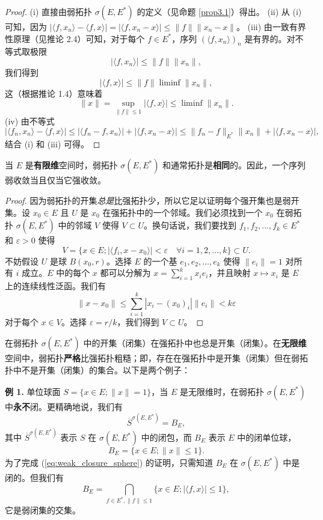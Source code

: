 \begin{proof}
(i) 直接由弱拓扑 $\sigma(E, E^*)$ 的定义（见命题 \ref{prop3.1}）得出。
(ii) 从 (i) 可知，因为 $|\langle f, x_n \rangle - \langle f, x \rangle| = |\langle f, x_n - x \rangle| \le \|f\| \|x_n - x\|$。
(iii) 由一致有界性原理（见推论 2.4）可知，对于每个 $f \in E^*$，序列 $(\langle f, x_n \rangle)_n$ 是有界的。对不等式取极限
\[ |\langle f, x_n \rangle| \le \|f\| \|x_n\|, \]
我们得到
\[ |\langle f, x \rangle| \le \|f\| \liminf \|x_n\|, \]
这（根据推论 1.4）意味着
\[ \|x\| = \sup_{\|f\| \le 1} |\langle f, x \rangle| \le \liminf \|x_n\|. \]
(iv) 由不等式
\[ |\langle f_n, x_n \rangle - \langle f, x \rangle| \le |\langle f_n - f, x_n \rangle| + |\langle f, x_n - x \rangle| \le \|f_n - f\|_{E^*} \|x_n\| + |\langle f, x_n - x \rangle|, \]
结合 (i) 和 (iii) 可得。
\end{proof}

\begin{proposition}\label{prop3.6}
当 $E$ 是\textbf{有限维}空间时，弱拓扑 $\sigma(E, E^*)$ 和通常拓扑是\textbf{相同}的。因此，一个序列弱收敛当且仅当它强收敛。
\end{proposition}

\begin{proof}
因为弱拓扑的开集\textit{总是}比强拓扑少，所以它足以证明每个强开集也是弱开集。设 $x_0 \in E$ 且 $U$ 是 $x_0$ 在强拓扑中的一个邻域。我们必须找到一个 $x_0$ 在弱拓扑 $\sigma(E, E^*)$ 中的邻域 $V$ 使得 $V \subset U$。换句话说，我们要找到 $f_1, f_2, \dots, f_k \in E^*$ 和 $\varepsilon > 0$ 使得
\[ V = \{x \in E; |\langle f_i, x - x_0 \rangle| < \varepsilon \quad \forall i = 1, 2, \dots, k\} \subset U. \]
不妨假设 $U$ 是球 $B(x_0, r)$。选择 $E$ 的一个基 $e_1, e_2, \dots, e_k$ 使得 $\|e_i\|=1$ 对所有 $i$ 成立。$E$ 中的每个 $x$ 都可以分解为 $x = \sum_{i=1}^k x_i e_i$，并且映射 $x \mapsto x_i$ 是 $E$ 上的连续线性泛函。我们有
\[ \|x - x_0\| \le \sum_{i=1}^k |x_i - (x_0)_i| \|e_i\| < k\varepsilon \]
对于每个 $x \in V$。选择 $\varepsilon = r/k$，我们得到 $V \subset U$。
\end{proof}

\begin{remark}\label{remark3.2}
在弱拓扑 $\sigma(E, E^*)$ 中的开集（闭集）在强拓扑中也总是开集（闭集）。在\textbf{无限维}空间中，弱拓扑\textbf{严格}比强拓扑粗糙；即，存在在强拓扑中是开集（闭集）但在弱拓扑中不是开集（闭集）的集合。以下是两个例子：
\end{remark}

\textbf{例 1.} 单位球面 $S = \{x \in E; \|x\| = 1\}$，当 $E$ 是无限维时，在弱拓扑 $\sigma(E, E^*)$ 中\textbf{永不}闭。更精确地说，我们有
\begin{equation}\label{eq:weak_closure_sphere}
\overline{S}^{\sigma(E, E^*)} = B_E,
\end{equation}
其中 $\overline{S}^{\sigma(E, E^*)}$ 表示 $S$ 在 $\sigma(E, E^*)$ 中的闭包，而 $B_E$ 表示 $E$ 中的闭单位球，
\[ B_E = \{x \in E; \|x\| \le 1\}. \]
为了完成 (\ref{eq:weak_closure_sphere}) 的证明，只需知道 $B_E$ 在 $\sigma(E, E^*)$ 中是闭的。但我们有
\[ B_E = \bigcap_{f \in E^*, \|f\| \le 1} \{x \in E; |\langle f, x \rangle| \le 1\}, \]
它是弱闭集的交集。

